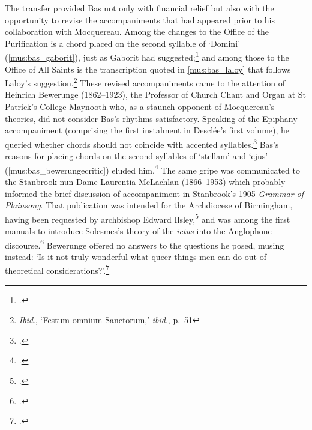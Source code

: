 The transfer provided Bas not only with financial relief but also with the opportunity to revise the accompaniments that had appeared prior to his collaboration with Mocquereau.
Among the changes to the Office of the Purification is a chord placed on the second syllable of `Domini' (\cref{mus:bas_gaborit}), just as Gaborit had suggested;\footcite[p.~11]{BasPurificationeMariaeVirginis1904} and among those to the Office of All Saints is the transcription quoted in \cref{mus:bas_laloy} that follows Laloy's suggestion.\footnote{\emph{Ibid}., `Festum omnium Sanctorum,' \emph{ibid}., p.~51}
\nocite{BasFestumomniumSanctorum1904}
These revised accompaniments came to the attention of Heinrich Bewerunge (1862--1923), the Professor of Church Chant and Organ at St Patrick's College Maynooth who, as a staunch opponent of Mocquereau's theories, did not consider Bas's rhythms satisfactory.
Speaking of the Epiphany accompaniment (comprising the first instalment in Desclée's first volume), he queried whether chords should not coincide with accented syllables.\footcite[222, 251--2]{McCarthyHeinrichBewerunge18622015}
Bas's reasons for placing chords on the second syllables of `stellam' and `ejus' (\cref{mus:bas_bewerungecritic}) eluded him.\footcite[5]{BasEpiphaniaDomini1904}
%
The same gripe was communicated to the Stanbrook nun Dame Laurentia McLachlan (1866--1953) which probably informed the brief discussion of accompaniment in Stanbrook's 1905 \emph{Grammar of Plainsong}.
That publication was intended for the Archdiocese of Birmingham, having been requested by archbishop Edward Ilsley,\footcite[209]{MuirRomanCatholicChurch2008} and was among the first manuals to introduce Solesmes's theory of the \emph{ictus} into the Anglophone discourse.\footcite[35, 62--3]{StanbrookGrammarPlainsongTwo1905}
Bewerunge offered no answers to the questions he posed, musing instead: `Is it not truly wonderful what queer things men can do out of theoretical considerations?'.\footnote{\cite[478--9]{BewerungeNoticesBooks1904}.\label{fn:bewerunge}}

